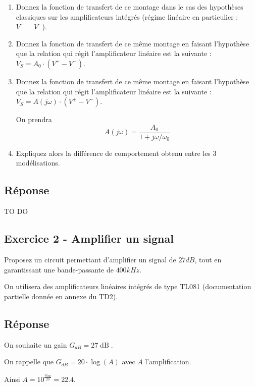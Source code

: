 \begin{enumerate}
	\item Donnez la fonction de transfert de ce montage dans le cas des hypothèses classiques sur les amplificateurs intégrés (régime linéaire en particulier : $V^+ = V^-$).

	\item Donnez la fonction de transfert de ce même montage en faisant l'hypothèse que la relation qui régit l'amplificateur linéaire est la suivante : $V_S = A_0 \cdot (V^+ - V^-)$. 

	\item Donnez la fonction de transfert de ce même montage en faisant l'hypothèse que la relation qui régit l'amplificateur linéaire est la suivante : $V_S = A(j\omega) \cdot (V^+ - V^-)$. 
	
	On prendra $$A(j\omega) = \frac{A_0}{1 + j \omega / \omega_0}$$
	
	\item Expliquez alors la différence de comportement obtenu entre les 3 modélisations.
\end{enumerate}

\subsection*{Réponse}

TO DO

\newpage
\subsection{Exercice 2 - Amplifier un signal}
Proposez un circuit permettant d'amplifier un signal de $27dB$, tout en garantissant une bande-passante de $400 kHz$.

On utilisera des amplificateurs linéaires intégrés de type TL081 (documentation partielle donnée en annexe du TD2).


\subsection*{Réponse}

On souhaite un gain $G_{dB} = 27\operatorname{dB}$.

On rappelle que $G_{dB} = 20 \cdot \log (A)$ avec $A$ l'amplification.

Ainsi $A = 10^{\frac{G_{dB}}{20}} = 22.4$.

\medskip

